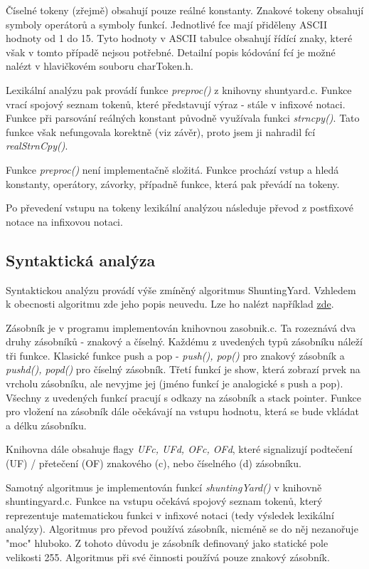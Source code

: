 \documentclass 	[a4paper,12pt]	{article}
\begin{document}
Číselné tokeny (zřejmě) obsahují pouze reálné konstanty. Znakové tokeny obsahují symboly operátorů a symboly funkcí. Jednotlivé fce mají přiděleny ASCII hodnoty od 1 do 15. Tyto hodnoty v ASCII tabulce obsahují řídící znaky, které však v tomto případě nejsou potřebné. Detailní popis kódování fcí je možné nalézt v hlavičkovém souboru charToken.h. 

Lexikální analýzu pak provádí funkce \emph{preproc()} z knihovny shuntyard.c. Funkce vrací spojový seznam tokenů, které představují výraz - stále v infixové notaci. Funkce při parsování reálných konstant původně využívala funkci \emph{strncpy()}. Tato funkce však nefungovala korektně (viz závěr), proto jsem ji nahradil fcí \emph{realStrnCpy()}.

Funkce \emph{preproc()} není implementačně složitá. Funkce prochází vstup a hledá konstanty, operátory, závorky, případně funkce, která pak převádí na tokeny.

Po převedení vstupu na tokeny lexikální analýzou následuje převod z postfixové notace na infixovou notaci.

\subsection{Syntaktická analýza}
\label{subsec:synt_an}
Syntaktickou analýzu provádí výše zmíněný algoritmus ShuntingYard. Vzhledem k obecnosti algoritmu zde jeho popis neuvedu. Lze ho nalézt například \href{http://en.wikipedia.org/wiki/Shunting-yard_algorithm}{zde}.

Zásobník je v programu implementován knihovnou zasobnik.c. Ta rozeznává dva druhy zásobníků - znakový a číselný. Každému z uvedených typů zásobníku náleží tři funkce. Klasické funkce push a pop - \emph{push(), pop()} pro znakový zásobník a \emph{pushd(), popd()} pro číselný zásobník. Třetí funkcí je show, která zobrazí prvek na vrcholu zásobníku, ale nevyjme jej (jméno funkcí je analogické  s push a pop). Všechny z uvedených funkcí pracují s odkazy na zásobník a stack pointer. Funkce pro vložení na zásobník dále očekávají na vstupu hodnotu, která se bude vkládat a délku zásobníku. 

Knihovna dále obsahuje flagy \emph{UFc, UFd, OFc, OFd}, které signalizují podtečení (UF) / přetečení (OF) znakového (c), nebo číselného (d) zásobníku. 

Samotný algoritmus je implementován funkcí \emph{shuntingYard()} v knihovně shuntingyard.c. Funkce na vstupu očekává spojový seznam tokenů, který reprezentuje matematickou funkci v infixové notaci (tedy výsledek lexikální analýzy). Algoritmus pro převod používá zásobník, nicméně se do něj nezanořuje "moc" hluboko. Z tohoto důvodu je zásobník definovaný jako statické pole velikosti 255. Algoritmus při své činnosti používá pouze znakový zásobník.
\end{document}
